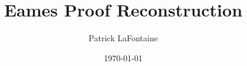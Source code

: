 \documentclass[12pt, a4paper]{article}
\title{Eames Proof Reconstruction}
\author{Patrick LaFontaine}
\date{\today}
\begin{document}
\maketitle

\begin{abstract}
\end{abstract}



\printbibliography
\end{document}
